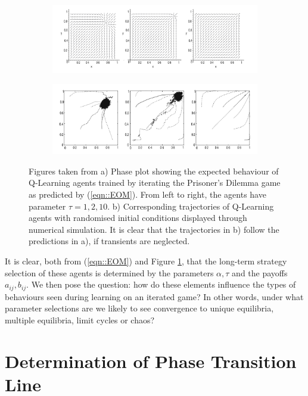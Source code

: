 \documentclass[letterpaper]{article} %
\begin{document}
    \begin{figure}
    \centering
        \begin{subfigure}[b]{0.9 \textwidth}
            \includegraphics[width=0.52 \textwidth]{Figures/Dynamics}
            \caption{}
        \end{subfigure}
        
        \begin{subfigure}[b]{0.9 \textwidth}
            \includegraphics[width=0.5 \textwidth]{Figures/Q-Learners}
            \caption{}
        \end{subfigure}

        \caption{ \label{fig::TuylsExperiments} Figures taken from \cite{Tuyls2006AnGames} a) Phase
        plot showing the expected behaviour of Q-Learning agents trained by iterating the
        Prisoner's Dilemma game as predicted by (\ref{eqn::EOM}). From left to right, the agents
        have parameter $\tau = 1, 2, 10$. b) Corresponding trajectories of Q-Learning agents with
        randomised initial conditions displayed through numerical simulation. It is clear that the
        trajectories in b) follow the predictions in a), if transients are neglected. }
    \end{figure}    

    It is clear, both from (\ref{eqn::EOM}) and Figure \ref{fig::TuylsExperiments}, that the long-term strategy selection of
    these agents is determined by the parameters $\alpha, \tau$ and the payoffs $a_{ij}, b_{ij}$. We
    then pose the question: how do these elements influence the types of behaviours seen during
    learning on an iterated game? In other words, under what parameter selections are we likely to
    see convergence to unique equilibria, multiple equilibria, limit cycles or chaos? 

\section{Determination of Phase Transition Line} \label{sec::Theory}
\end{document}

